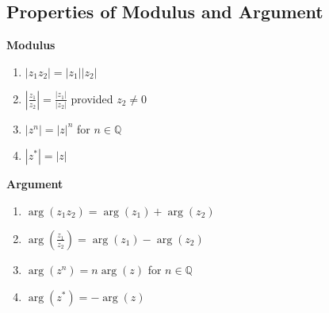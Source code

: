 \documentclass[11pt,a4paper]{book}
\newcommand{\Q}{\mathbb{Q}}
\begin{document}
\subsection{Properties of Modulus and Argument}

\begin{minipage}{.8\textwidth}

\begin{tcolorbox}[colback=blue!5, colframe=black, boxrule=.4pt, sharpish corners]

\begin{minipage}[t]{0.5\textwidth}

\textbf{Modulus}

\begin{enumerate}

\item  $\left|z_{1}z_{2}\right|=\left|z_{1}\right|\left|z_{2}\right|$

\item  ${\displaystyle \left|\frac{z_{1}}{z_{2}}\right|=\frac{\left|z_{1}\right|}{\left|z_{2}\right|}}$
provided $z_{2}\neq0$

\item  $\left|z^{n}\right|=\left|z\right|^{n}$ for $n\in\Q$

\item  $\left|z^{*}\right|=\left|z\right|$


\end{enumerate}

\end{minipage}
\begin{minipage}[t]{0.5\textwidth}

\textbf{Argument}

\begin{enumerate}

\item  $\arg\left(z_{1}z_{2}\right)=\arg\left(z_{1}\right)+\arg\left(z_{2}\right)$

\item  ${\displaystyle \arg\left(\frac{z_{1}}{z_{2}}\right)=\arg\left(z_{1}\right)-\arg\left(z_{2}\right)}$

\item  $\arg\left(z^{n}\right)=n\arg\left(z\right)$ for $n\in\Q$

\item  $\arg\left(z^{*}\right)=-\arg\left(z\right)$

\end{enumerate}

\end{minipage}

\medskip{}

\end{tcolorbox}

\end{minipage}
\end{document}
